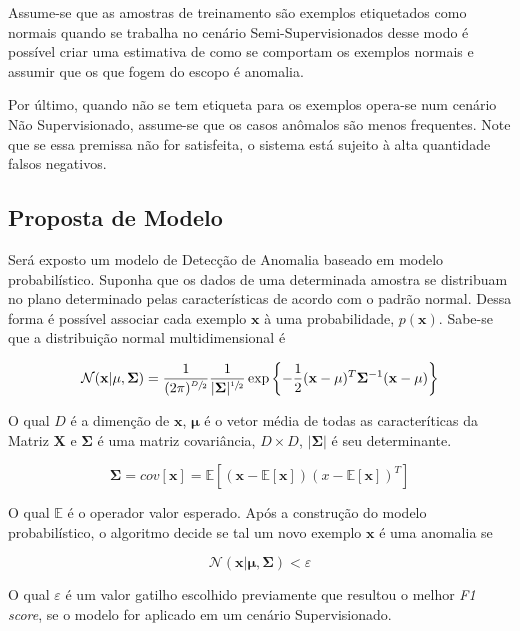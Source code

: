 Assume-se que as amostras de treinamento são exemplos etiquetados como normais quando se trabalha no cenário Semi-Supervisionados desse modo é possível criar uma estimativa de como se comportam os exemplos normais e assumir que os que fogem do escopo é anomalia.

Por último, quando não se tem etiqueta para os exemplos opera-se num cenário Não Supervisionado, assume-se que os casos anômalos são menos frequentes. Note que se essa premissa não for satisfeita, o sistema está sujeito à alta quantidade falsos negativos.

\subsection{Proposta de Modelo}

Será exposto um modelo de Detecção de Anomalia baseado em modelo probabilístico. Suponha que os dados de uma determinada amostra se distribuam no plano determinado pelas características de acordo com o padrão normal. Dessa forma é possível associar cada exemplo \(\mathbf{x}\) à uma probabilidade, \(p(\mathbf{x})\).
Sabe-se\cite{bishop2006pattern} que a distribuição normal multidimensional é

\[\mathcal{N}(\mathbf{x}|\mathbf{\mu},\mathbf{\Sigma})=\frac{1}{(2\pi)^{\sfrac{D}{2}}} \frac{1}{|\mathbf{\Sigma}|^{\sfrac{1}{2}}}\exp\left\{ -\frac{1}{2} (\mathbf{x} - \mathbf{\mu})^T \mathbf{\Sigma}^{-1} (\mathbf{x} - \mathbf{\mu}) \right\}\]

O qual \(D\) é a dimenção de \(\mathbf{x}\), \(\mathbf{\mu}\) é o vetor média de todas as caracteríticas da Matriz \(\mathbf{X}\) e \(\mathbf{\Sigma}\) é uma matriz covariância, \(D \times D\), \(|\mathbf{\Sigma}|\) é seu determinante.

\[\mathbf{\Sigma}=\mathit{cov}[ \mathbf{x} ] = \mathbb{E} \left \lbrack ( \mathbf{x} - \mathbb{E} [ \mathbf{x} ] ) ( x - \mathbb{E} [ \mathbf{x} ] ) ^ T \right \rbrack \]

O qual \(\mathbb{E}\) é o operador valor esperado. Após a construção do modelo probabilístico, o algoritmo decide se tal um novo exemplo \(\mathbf{x}\) é uma anomalia se

\[\mathcal{N}(\mathbf{x}|\mathbf{\mu},\mathbf{\Sigma}) < \varepsilon\]

O qual \(\varepsilon\) é um valor gatilho escolhido previamente que resultou o melhor \textit{F1 score}, se o modelo for aplicado em um cenário Supervisionado.

